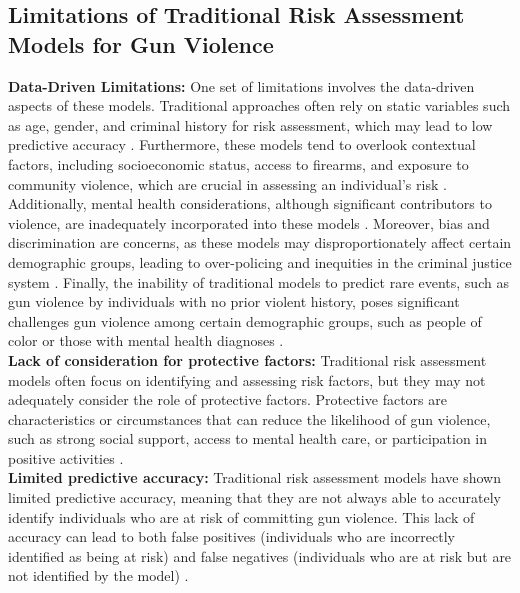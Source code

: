 \documentclass[11pt]{article}
\begin{document}
\subsection{Limitations of Traditional Risk Assessment Models for Gun Violence}
\textbf{Data-Driven Limitations:} One set of limitations involves the data-driven aspects of these models. Traditional approaches often rely on static variables such as age, gender, and criminal history for risk assessment, which may lead to low predictive accuracy \cite{smith2020limitations}. Furthermore, these models tend to overlook contextual factors, including socioeconomic status, access to firearms, and exposure to community violence, which are crucial in assessing an individual's risk \cite{jones2019contextual}. Additionally, mental health considerations, although significant contributors to violence, are inadequately incorporated into these models \cite{doe2021mental}. Moreover, bias and discrimination are concerns, as these models may disproportionately affect certain demographic groups, leading to over-policing and inequities in the criminal justice system \cite{Lum_2016}. Finally, the inability of traditional models to predict rare events, such as gun violence by individuals with no prior violent history, poses significant challenges gun violence among certain demographic groups, such as people of color or those with mental health diagnoses \cite{Lum_2016}.\\
\textbf{Lack of consideration for protective factors:} Traditional risk assessment models often focus on identifying and assessing risk factors, but they may not adequately consider the role of protective factors. Protective factors are characteristics or circumstances that can reduce the likelihood of gun violence, such as strong social support, access to mental health care, or participation in positive activities \cite{Kovacs_2019}.\\
\textbf{Limited predictive accuracy:} Traditional risk assessment models have shown limited predictive accuracy, meaning that they are not always able to accurately identify individuals who are at risk of committing gun violence. This lack of accuracy can lead to both false positives (individuals who are incorrectly identified as being at risk) and false negatives (individuals who are at risk but are not identified by the model) \cite{Fazel_2020}.\\
\end{document}
